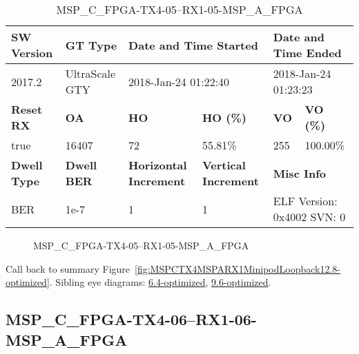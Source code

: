 \begin{table}[h]
\centering
\caption{MSP\_C\_FPGA-TX4-05--RX1-05-MSP\_A\_FPGA}
\label{tab:MSPCFPGATX405RX105MSPAFPGA12.8-optimized}
\begin{tabular}{@{}|l|l|l|l|l|l|@{}}
\toprule
\textbf{SW Version}                & \textbf{GT Type}   & \multicolumn{2}{l|}{\textbf{Date and Time Started}}            & \multicolumn{2}{l|}{\textbf{Date and Time Ended}}        \\ \midrule
2017.2                       & UltraScale GTY          & \multicolumn{2}{l|}{2018-Jan-24 01:22:40}                   & \multicolumn{2}{l|}{2018-Jan-24 01:23:23}               \\ \midrule
\textbf{Reset RX}                  & \textbf{OA} & \textbf{HO}   & \textbf{HO (\%)} & \textbf{VO} & \textbf{VO (\%)} \\ \midrule
true & 16407        & 72          & 55.81\%        & 255        & 100.00\%       \\ \midrule
\textbf{Dwell Type}                & \textbf{Dwell BER} & \textbf{Horizontal Increment} & \textbf{Vertical Increment}    & \multicolumn{2}{l|}{\textbf{Misc Info}}                  \\ \midrule
BER                            & 1e-7        & 1        & 1           & \multicolumn{2}{l|}{ELF Version: 0x4002 SVN: 0}                         \\ \bottomrule
\end{tabular}
\end{table}

\begin{figure}[h]
\caption{MSP\_C\_FPGA-TX4-05--RX1-05-MSP\_A\_FPGA} \label{fig:MSPCFPGATX405RX105MSPAFPGA12.8-optimized}
\end{figure}

Call back to summary Figure~\ref{fig:MSPCTX4MSPARX1MinipodLoopback12.8-optimized}.
Sibling eye diagrams: \hyperref[sec:MSPCFPGATX405RX105MSPAFPGA6.4-optimized]{6.4-optimized}, \hyperref[sec:MSPCFPGATX405RX105MSPAFPGA9.6-optimized]{9.6-optimized}.

\clearpage
\newpage


\subsection{MSP\_C\_FPGA-TX4-06--RX1-06-MSP\_A\_FPGA}\label{sec:MSPCFPGATX406RX106MSPAFPGA12.8-optimized}


